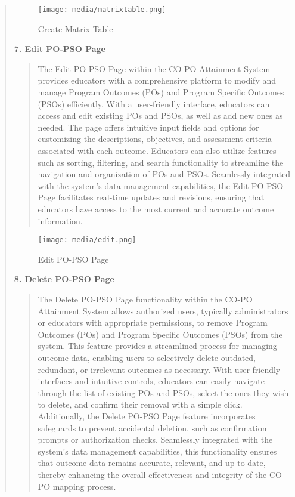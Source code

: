 \documentclass[12pt]{report}
\begin{document}
\begin{quote}
\begin{quote}
		\end{quote}
		
		\begin{figure}[h]
			\centering
			\texttt{[image: media/matrixtable.png]}\\
			\caption{Create Matrix Table}
			\vspace{0.5cm}
		\end{figure}
		\clearpage
		
		\textbf{7. Edit PO-PSO Page}\\
		\begin{quote}
			The Edit PO-PSO Page within the CO-PO Attainment System provides educators with a comprehensive platform to modify and manage Program Outcomes (POs) and Program Specific Outcomes (PSOs) efficiently. With a user-friendly interface, educators can access and edit existing POs and PSOs, as well as add new ones as needed. The page offers intuitive input fields and options for customizing the descriptions, objectives, and assessment criteria associated with each outcome. Educators can also utilize features such as sorting, filtering, and search functionality to streamline the navigation and organization of POs and PSOs. Seamlessly integrated with the system's data management capabilities, the Edit PO-PSO Page facilitates real-time updates and revisions, ensuring that educators have access to the most current and accurate outcome information.
			\\[3ex]
			
		\end{quote}
		
		\begin{figure}[h]
			\centering
			\texttt{[image: media/edit.png]}\\
			\caption{Edit PO-PSO Page}
			\vspace{0.5cm}
		\end{figure}
		\clearpage
		
		\textbf{8. Delete PO-PSO Page}\\
		\begin{quote}
			The Delete PO-PSO Page functionality within the CO-PO Attainment System allows authorized users, typically administrators or educators with appropriate permissions, to remove Program Outcomes (POs) and Program Specific Outcomes (PSOs) from the system. This feature provides a streamlined process for managing outcome data, enabling users to selectively delete outdated, redundant, or irrelevant outcomes as necessary. With user-friendly interfaces and intuitive controls, educators can easily navigate through the list of existing POs and PSOs, select the ones they wish to delete, and confirm their removal with a simple click. Additionally, the Delete PO-PSO Page feature incorporates safeguards to prevent accidental deletion, such as confirmation prompts or authorization checks. Seamlessly integrated with the system's data management capabilities, this functionality ensures that outcome data remains accurate, relevant, and up-to-date, thereby enhancing the overall effectiveness and integrity of the CO-PO mapping process.
			\\[3ex]
			

\end{quote}
\end{quote}
\end{document}
